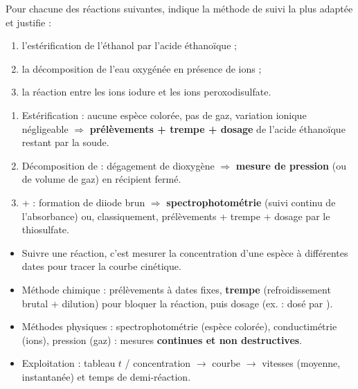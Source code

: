 \documentclass[11pt]{article}
\begin{document}
\begin{exercice}
Pour chacune des réactions suivantes, indique la méthode de suivi la plus adaptée et justifie :
\begin{enumerate}
\item l'estérification de l'éthanol par l'acide éthanoïque ;
\item la décomposition de l'eau oxygénée en présence de ions  ;
\item la réaction entre les ions iodure et les ions peroxodisulfate.
\end{enumerate}
\end{exercice}

\begin{corrige}[Exercice 1]
\begin{enumerate}
\item Estérification : aucune espèce colorée, pas de gaz, variation ionique négligeable $\Rightarrow$ \textbf{prélèvements + trempe + dosage} de l'acide éthanoïque restant par la soude.
\item Décomposition de  : dégagement de dioxygène $\Rightarrow$ \textbf{mesure de pression} (ou de volume de gaz) en récipient fermé.
\item {} +  : formation de diiode brun $\Rightarrow$ \textbf{spectrophotométrie} (suivi continu de l'absorbance) ou, classiquement, prélèvements + trempe + dosage par le thiosulfate.
\end{enumerate}
\end{corrige}

\begin{aretenir}
\begin{itemize}
\item Suivre une réaction, c'est mesurer la concentration d'une espèce à différentes dates pour tracer la courbe cinétique.
\item Méthode chimique : prélèvements à dates fixes, \textbf{trempe} (refroidissement brutal + dilution) pour bloquer la réaction, puis dosage (ex. :  dosé par ).
\item Méthodes physiques : spectrophotométrie (espèce colorée), conductimétrie (ions), pression (gaz) : mesures \textbf{continues et non destructives}.
\item Exploitation : tableau $t$ / concentration $\rightarrow$ courbe $\rightarrow$ vitesses (moyenne, instantanée) et temps de demi-réaction.
\end{itemize}
\end{aretenir}
\end{document}
